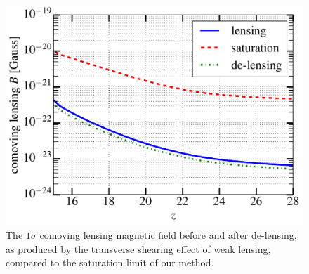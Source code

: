 \documentclass[aps,prd,twocolumn,floatfix,showpacs,superscriptaddress,nofootinbib]{revtex4-1}
\begin{document}
\begin{figure}[h]
\centering
\includegraphics[scale=0.4]{delensingB.pdf}
\caption{The $1\sigma$ comoving lensing magnetic field before and after de-lensing, as produced by the transverse shearing effect of weak lensing, compared to the saturation limit of our method.}
\label{fig:ps_B}
\end{figure}
\end{document}

